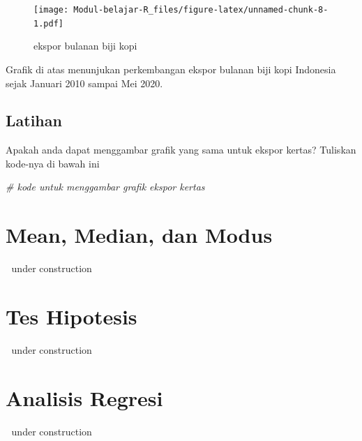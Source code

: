 \documentclass[
]{book}
\newenvironment{Shaded}{\begin{snugshade}}{\end{snugshade}}
\newcommand{\CommentTok}[1]{\textcolor[rgb]{0.56,0.35,0.01}{\textit{#1}}}
\newcommand{\DataTypeTok}[1]{\textcolor[rgb]{0.13,0.29,0.53}{#1}}
\newcommand{\KeywordTok}[1]{\textcolor[rgb]{0.13,0.29,0.53}{\textbf{#1}}}
\newcommand{\NormalTok}[1]{#1}
\newcommand{\OperatorTok}[1]{\textcolor[rgb]{0.81,0.36,0.00}{\textbf{#1}}}
\newcommand{\StringTok}[1]{\textcolor[rgb]{0.31,0.60,0.02}{#1}}
\begin{document}
\begin{Shaded}
\end{Shaded}

\begin{figure}
\centering
\texttt{[image: Modul-belajar-R\_files/figure-latex/unnamed-chunk-8-1.pdf]}
\caption{\label{fig:unnamed-chunk-8}ekspor bulanan biji kopi}
\end{figure}

Grafik di atas menunjukan perkembangan ekspor bulanan biji kopi Indonesia sejak Januari 2010 sampai Mei 2020.

\hypertarget{latihan}{%
\section{Latihan}\label{latihan}}

Apakah anda dapat menggambar grafik yang sama untuk ekspor kertas? Tuliskan kode-nya di bawah ini

\begin{Shaded}
\begin{Highlighting}[]
\CommentTok{# kode untuk menggambar grafik ekspor kertas}
\end{Highlighting}
\end{Shaded}

\hypertarget{mean-median-dan-modus}{%
\chapter{Mean, Median, dan Modus}\label{mean-median-dan-modus}}

🚧 under construction 🚧

\hypertarget{tes-hipotesis}{%
\chapter{Tes Hipotesis}\label{tes-hipotesis}}

🚧 under construction 🚧

\hypertarget{analisis-regresi}{%
\chapter{Analisis Regresi}\label{analisis-regresi}}

🚧 under construction 🚧

  
\end{document}
